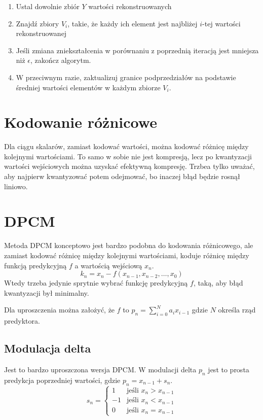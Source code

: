 \documentclass{../notatki}
\begin{document}
\begin{enumerate}
\item Ustal dowolnie zbiór $Y$ wartości rekonstruowanych
\item Znajdź zbiory $V_i$, takie, że każdy ich element jest najbliżej $i$-tej
wartości rekonstruowanej
\item Jeśli zmiana zniekształcenia w porównaniu z poprzednią iteracją
jest mniejsza
niż $\epsilon$, zakończ algorytm.
\item W przeciwnym razie, zaktualizuj granice podprzedziałów na podstawie
średniej wartości elementów w każdym zbiorze $V_i$.
\end{enumerate}

\section{Kodowanie różnicowe}

Dla ciągu skalarów, zamiast kodować wartości, można kodować różnicę między
kolejnymi wartościami. To samo w sobie nie jest kompresją, lecz po kwantyzacji
wartości wejściowych można uzyskać efektywną kompresję. Trzbea tylko uważać,
aby najpierw kwantyzować potem odejmować, bo inaczej błąd będzie rosnął liniowo.

\section{DPCM}

Metoda DPCM konceptowo jest bardzo podobna do kodowania różnicowego, ale zamiast
kodować różnicę między kolejnymi wartościami, koduje różnicę między funkcją
predykcyjną $f$ a wartością wejściową $x_n$.
$$
k_n = x_n -f(x_{n-1}, x_{n-2}, \dots, x_{0})
$$
Wtedy trzeba jedynie sprytnie wybrać funkcję predykcyjną $f$, taką, aby
błąd kwantyzacji był minimalny.

Dla uproszczenia można założyć, że $f$ to $p_n = \sum_{i=0}^{N} a_i x_{i - 1}$
gdzie $N$ określa rząd predyktora.

\subsection{Modulacja delta}

Jest to bardzo uproszczona wersja DPCM. W modulacji delta $p_n$ jest to
prosta predykcja poprzedniej wartości, gdzie $p_n = x_{n-1} + s_n$.
$$
s_n =
\begin{cases}
1 & \text{jeśli } x_n > x_{n-1} \\
-1 & \text{jeśli } x_n < x_{n-1} \\
0 & \text{jeśli } x_n = x_{n-1}
\end{cases}
$$
\end{document}
